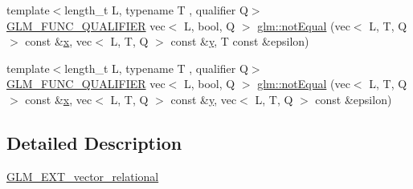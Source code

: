 \begin{DoxyCompactItemize}
\item 
{\footnotesize template$<$length\+\_\+t L, typename T , qualifier Q$>$ }\\\mbox{\hyperlink{setup_8hpp_a33fdea6f91c5f834105f7415e2a64407}{G\+L\+M\+\_\+\+F\+U\+N\+C\+\_\+\+Q\+U\+A\+L\+I\+F\+I\+ER}} vec$<$ L, bool, Q $>$ \mbox{\hyperlink{group__ext__vector__relational_ga59a03a51402b6e1ce80f9a3b436f17bd}{glm\+::not\+Equal}} (vec$<$ L, T, Q $>$ const \&\mbox{\hyperlink{_s_d_l__opengl_8h_ad0e63d0edcdbd3d79554076bf309fd47}{x}}, vec$<$ L, T, Q $>$ const \&\mbox{\hyperlink{_s_d_l__opengl_8h_a1675d9d7bb68e1657ff028643b4037e3}{y}}, T const \&epsilon)
\item 
{\footnotesize template$<$length\+\_\+t L, typename T , qualifier Q$>$ }\\\mbox{\hyperlink{setup_8hpp_a33fdea6f91c5f834105f7415e2a64407}{G\+L\+M\+\_\+\+F\+U\+N\+C\+\_\+\+Q\+U\+A\+L\+I\+F\+I\+ER}} vec$<$ L, bool, Q $>$ \mbox{\hyperlink{group__ext__vector__relational_ga0497a636e5e8140bb7ebc021baf86637}{glm\+::not\+Equal}} (vec$<$ L, T, Q $>$ const \&\mbox{\hyperlink{_s_d_l__opengl_8h_ad0e63d0edcdbd3d79554076bf309fd47}{x}}, vec$<$ L, T, Q $>$ const \&\mbox{\hyperlink{_s_d_l__opengl_8h_a1675d9d7bb68e1657ff028643b4037e3}{y}}, vec$<$ L, T, Q $>$ const \&epsilon)
\end{DoxyCompactItemize}


\subsection{Detailed Description}
\mbox{\hyperlink{group__ext__vector__relational}{G\+L\+M\+\_\+\+E\+X\+T\+\_\+vector\+\_\+relational}} 